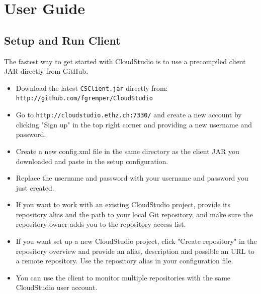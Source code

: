 

\chapter{User Guide}\label{userguide}





\section{Setup and Run Client}

The fastest way to get started with CloudStudio is to use a precompiled client JAR directly from GitHub.

\begin{itemize}

\item Download the latest \texttt{CSClient.jar} directly from: \newline \texttt{http://github.com/fgremper/CloudStudio}

\item Go to \texttt{http://cloudstudio.ethz.ch:7330/} and create a new account by clicking "Sign up" in the top right corner and providing a new username and password.

\item Create a new config.xml file in the same directory as the client JAR you downloaded and paste in the setup configuration.

\item Replace the username and password with your username and password you just created.

\item If you want to work with an existing CloudStudio project, provide its repository alias and the path to your local Git repository, and make sure the repository owner adds you to the repository access list.

\item If you want set up a new CloudStudio project, click "Create repository" in the repository overview and provide an alias, description and possible an URL to a remote repository. Use the repository alias in your configuration file.

\item You can use the client to monitor multiple repositories with the same CloudStudio user account.

\end{itemize}


